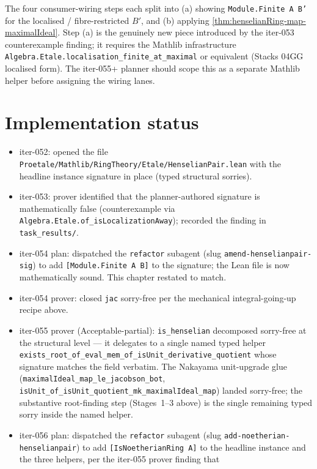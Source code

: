 The four consumer-wiring steps each split into (a) showing
\texttt{Module.Finite A B'} for the localised / fibre-restricted
$B'$, and (b) applying \cref{thm:henselianRing-map-maximalIdeal}.
Step (a) is the genuinely new piece introduced by the iter-053
counterexample finding; it requires the Mathlib infrastructure
\texttt{Algebra.Etale.localisation\_finite\_at\_maximal} or
equivalent (Stacks 04GG localised form). The iter-055+ planner
should scope this as a separate Mathlib helper before assigning
the wiring lanes.

\section{Implementation status}

\begin{itemize}
\item iter-052: opened the file
  \texttt{Proetale/Mathlib/RingTheory/Etale/HenselianPair.lean}
  with the headline instance signature in place (typed
  structural sorries).
\item iter-053: prover identified that the planner-authored
  signature is mathematically false (counterexample via
  \texttt{Algebra.Etale.of\_isLocalizationAway}); recorded the
  finding in \texttt{task\_results/}.
\item iter-054 plan: dispatched the \texttt{refactor} subagent
  (slug \texttt{amend-henselianpair-sig}) to add
  \texttt{[Module.Finite A B]} to the signature; the Lean file
  is now mathematically sound. This chapter restated to match.
\item iter-054 prover: closed \texttt{jac} sorry-free per the
  mechanical integral-going-up recipe above.
\item iter-055 prover (Acceptable-partial): \texttt{is\_henselian}
  decomposed sorry-free at the structural level — it delegates to
  a single named typed helper
  \texttt{exists\_root\_of\_eval\_mem\_of\_isUnit\_derivative\_quotient}
  whose signature matches the field verbatim. The Nakayama
  unit-upgrade glue (\texttt{maximalIdeal\_map\_le\_jacobson\_bot},
  \texttt{isUnit\_of\_isUnit\_quotient\_mk\_maximalIdeal\_map})
  landed sorry-free; the substantive root-finding step
  (Stages~1–3 above) is the single remaining typed sorry inside
  the named helper.
\item iter-056 plan: dispatched the \texttt{refactor} subagent
  (slug \texttt{add-noetherian-henselianpair}) to add
  \texttt{[IsNoetherianRing A]} to the headline instance and the
  three helpers, per the iter-055 prover finding that

\end{itemize}
